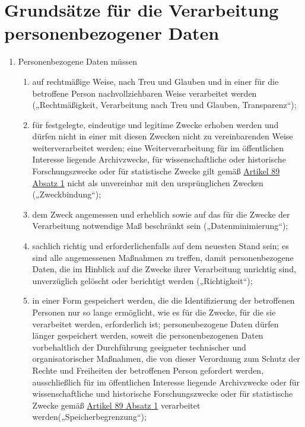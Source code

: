 \chapter{Grundsätze für die Verarbeitung personenbezogener Daten}
\label{ch:05}


\begin{enumerate}

  \item Personenbezogene Daten müssen
  \label{itm:05-1}

  \begin{enumerate}
  
    \item auf rechtmäßige Weise, nach Treu und Glauben und in einer für die betroffene Person nachvollziehbaren Weise
     verarbeitet werden („Rechtmäßigkeit, Verarbeitung nach Treu und Glauben, Transparenz“);
    \label{itm:05-1a}

    \item für festgelegte, eindeutige und legitime Zwecke erhoben werden und dürfen nicht in einer mit diesen Zwecken
     nicht zu vereinbarenden Weise weiterverarbeitet werden; eine Weiterverarbeitung für im öffentlichen Interesse
     liegende Archivzwecke, für wissenschaftliche oder historische Forschungszwecke oder für statistische Zwecke gilt
     gemäß \hyperref[itm:89-1]{Artikel 89 Absatz 1} nicht als unvereinbar mit den ursprünglichen
     Zwecken („Zweckbindung“);
    \label{itm:05-1b}

    \item dem Zweck angemessen und erheblich sowie auf das für die Zwecke der Verarbeitung notwendige Maß beschränkt
     sein („Datenminimierung“);
    \label{itm:05-1c}

    \item sachlich richtig und erforderlichenfalls auf dem neuesten Stand sein; es sind alle angemessenen Maßnahmen zu
     treffen, damit personenbezogene Daten, die im Hinblick auf die Zwecke ihrer Verarbeitung unrichtig sind,
     unverzüglich gelöscht oder berichtigt werden („Richtigkeit“);
    \label{itm:05-1d}

    \item in einer Form gespeichert werden, die die Identifizierung der betroffenen Personen nur so lange ermöglicht,
     wie es für die Zwecke, für die sie verarbeitet werden, erforderlich ist; personenbezogene Daten dürfen länger
     gespeichert werden, soweit die personenbezogenen Daten vorbehaltlich der Durchführung geeigneter technischer und
     organisatorischer Maßnahmen, die von dieser Verordnung zum Schutz der Rechte und Freiheiten der betroffenen Person
     gefordert werden, ausschließlich für im öffentlichen Interesse liegende Archivzwecke oder für wissenschaftliche
     und historische Forschungszwecke oder für statistische Zwecke gemäß \hyperref[itm:89-1]{Artikel 89 Absatz 1}
     verarbeitet werden(„Speicherbegrenzung“);
    \label{itm:05-1e}


\end{enumerate}
\end{enumerate}
